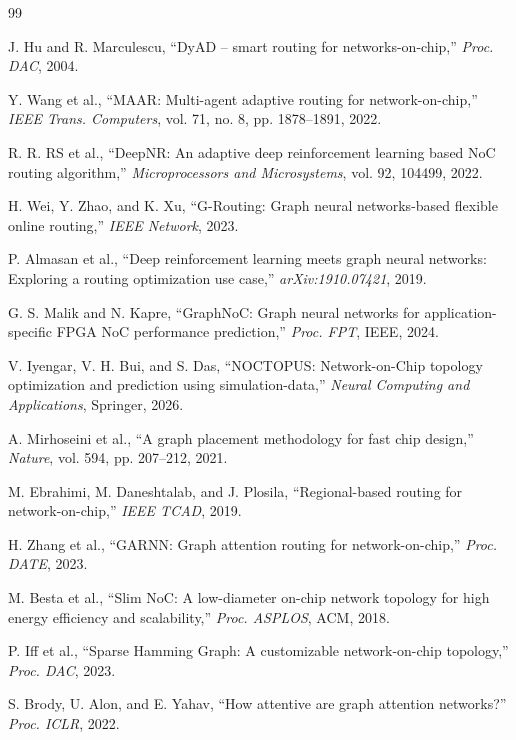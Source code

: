 \documentclass[conference]{IEEEtran}
\begin{document}
\begin{thebibliography}{99}

 J. Hu and R. Marculescu, ``DyAD -- smart routing for networks-on-chip,'' \textit{Proc. DAC}, 2004.

 Y. Wang et al., ``MAAR: Multi-agent adaptive routing for network-on-chip,'' \textit{IEEE Trans. Computers}, vol. 71, no. 8, pp. 1878--1891, 2022.

 R. R. RS et al., ``DeepNR: An adaptive deep reinforcement learning based NoC routing algorithm,'' \textit{Microprocessors and Microsystems}, vol. 92, 104499, 2022.

 H. Wei, Y. Zhao, and K. Xu, ``G-Routing: Graph neural networks-based flexible online routing,'' \textit{IEEE Network}, 2023.

 P. Almasan et al., ``Deep reinforcement learning meets graph neural networks: Exploring a routing optimization use case,'' \textit{arXiv:1910.07421}, 2019.

 G. S. Malik and N. Kapre, ``GraphNoC: Graph neural networks for application-specific FPGA NoC performance prediction,'' \textit{Proc. FPT}, IEEE, 2024.

 V. Iyengar, V. H. Bui, and S. Das, ``NOCTOPUS: Network-on-Chip topology optimization and prediction using simulation-data,'' \textit{Neural Computing and Applications}, Springer, 2026.

 A. Mirhoseini et al., ``A graph placement methodology for fast chip design,'' \textit{Nature}, vol. 594, pp. 207--212, 2021.

 M. Ebrahimi, M. Daneshtalab, and J. Plosila, ``Regional-based routing for network-on-chip,'' \textit{IEEE TCAD}, 2019.

 H. Zhang et al., ``GARNN: Graph attention routing for network-on-chip,'' \textit{Proc. DATE}, 2023.

 M. Besta et al., ``Slim NoC: A low-diameter on-chip network topology for high energy efficiency and scalability,'' \textit{Proc. ASPLOS}, ACM, 2018.

 P. Iff et al., ``Sparse Hamming Graph: A customizable network-on-chip topology,'' \textit{Proc. DAC}, 2023.

 S. Brody, U. Alon, and E. Yahav, ``How attentive are graph attention networks?'' \textit{Proc. ICLR}, 2022.


\end{thebibliography}
\end{document}
